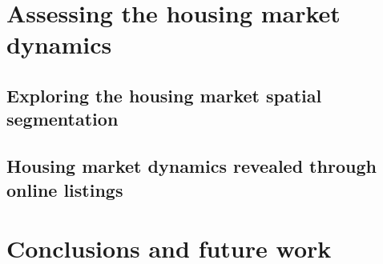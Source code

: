 \documentclass[
	11pt, %
	a4paper,
]{LegrandOrangeBook}
\begin{document}

\part{Assessing the housing market dynamics}

\renewcommand{\thechapter}{7} %
\chapterspaceabove{6.75cm}
\chapterspacebelow{7.25cm}

\chapter{Exploring the housing market spatial segmentation \label{ch:Exploring the housing market spatial segmentation}}


\renewcommand{\thechapter}{8} %

\chapterspaceabove{6.75cm}
\chapterspacebelow{7.25cm}

\chapter{Housing market dynamics revealed through online listings \label{ch:Housing market dynamics revealed through online listings}}



\part{Conclusions and future work}
\end{document}
